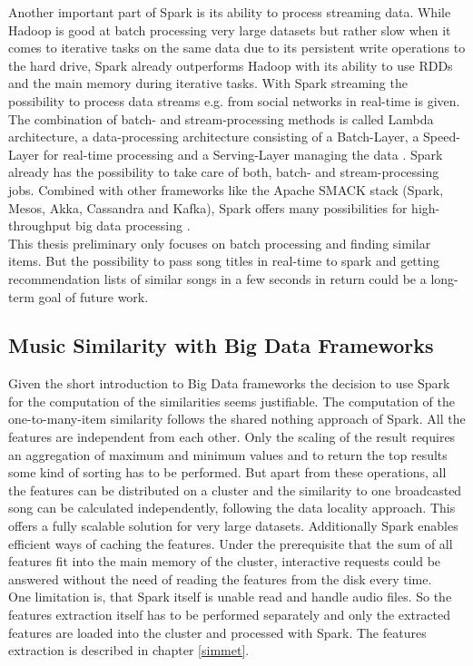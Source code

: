 \noindent Another important part of Spark is its ability to process streaming data. While Hadoop is good at batch processing very large datasets but rather slow when it comes to iterative tasks on the same data due to its persistent write operations to the hard drive, Spark already outperforms Hadoop with its ability to use RDDs and the main memory during iterative tasks. 
With Spark streaming the possibility to process data streams e.g. from social networks in real-time is given. 
The combination of batch- and stream-processing methods is called Lambda architecture, a data-processing architecture consisting of a Batch-Layer, a Speed-Layer for real-time processing and a Serving-Layer managing the data \cite[pp. 8 f]{nextgenbig}. Spark already has the possibility to take care of both, batch- and stream-processing jobs. Combined with other frameworks like the Apache SMACK stack (Spark, Mesos, Akka, Cassandra and Kafka), Spark offers many possibilities for high-throughput big data processing \cite[p. 5]{smack}.\\
This thesis preliminary only focuses on batch processing and finding similar items. But the possibility to pass song titles in real-time to spark and getting recommendation lists of similar songs in a few seconds in return could be a long-term goal of future work.\\

\subsection{Music Similarity with Big Data Frameworks}

Given the short introduction to Big Data frameworks the decision to use Spark for the computation of the similarities seems justifiable. The computation of the one-to-many-item similarity follows the shared nothing approach of Spark. All the features are independent from each other. Only the scaling of the result requires an aggregation of maximum and minimum values and to return the top results some kind of sorting has to be performed. But apart from these operations, all the features can be distributed on a cluster and the similarity to one broadcasted song can be calculated independently, following the data locality approach. This offers a fully scalable solution for very large datasets. Additionally Spark enables efficient ways of caching the features. Under the prerequisite that the sum of all features fit into the main memory of the cluster, interactive requests could be answered without the need of reading the features from the disk every time.\\
One limitation is, that Spark itself is unable read and handle audio files. So the features extraction itself has to be performed separately and only the extracted features are loaded into the cluster and processed with Spark. The features extraction is described in chapter \ref{simmet}.

